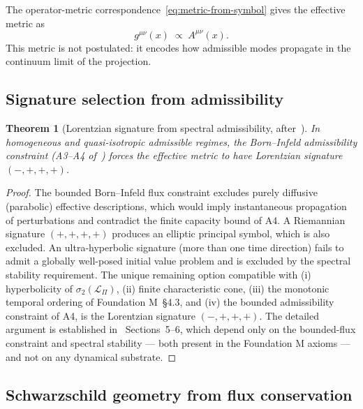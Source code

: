 \documentclass[11pt,a4paper]{article}
\newtheorem{theorem}{Theorem}[section]
\begin{document}
      The operator-metric correspondence~\eqref{eq:metric-from-symbol} gives the
      effective metric as
      \begin{equation}
        g^{\mu\nu}(x) \;\propto\; A^{\mu\nu}(x).
      \end{equation}
      This metric is not postulated: it encodes how admissible modes propagate in
      the continuum limit of the projection.

    \subsection{Signature selection from admissibility}

      \begin{theorem}[Lorentzian signature from spectral admissibility,
        after~\cite{BornInfeld}]
        \label{thm:signature}
        In homogeneous and quasi-isotropic admissible regimes, the Born--Infeld
        admissibility constraint (A3--A4 of~\cite{FoundationM}) forces the effective
        metric to have Lorentzian signature $(-,+,+,+)$.
      \end{theorem}

      \begin{proof}
        The bounded Born--Infeld flux constraint excludes purely diffusive
        (parabolic) effective descriptions, which would imply instantaneous
        propagation of perturbations and contradict the finite capacity bound of A4.
        A Riemannian signature $(+,+,+,+)$ produces an elliptic principal symbol,
        which is also excluded.
        An ultra-hyperbolic signature (more than one time direction) fails to
        admit a globally well-posed initial value problem and is excluded by the
        spectral stability requirement.
        The unique remaining option compatible with (i) hyperbolicity of
        $\sigma_2(\mathcal{L}_\Pi)$, (ii) finite characteristic cone, (iii) the
        monotonic temporal ordering of Foundation M~§4.3, and (iv) the bounded
        admissibility constraint of A4, is the Lorentzian signature $(-,+,+,+)$.
        The detailed argument is established in~\cite{BornInfeld} Sections~5--6,
        which depend only on the bounded-flux constraint and spectral stability —
        both present in the Foundation M axioms — and not on any dynamical
        substrate.
      \end{proof}

    \subsection{Schwarzschild geometry from flux conservation}
\end{document}

